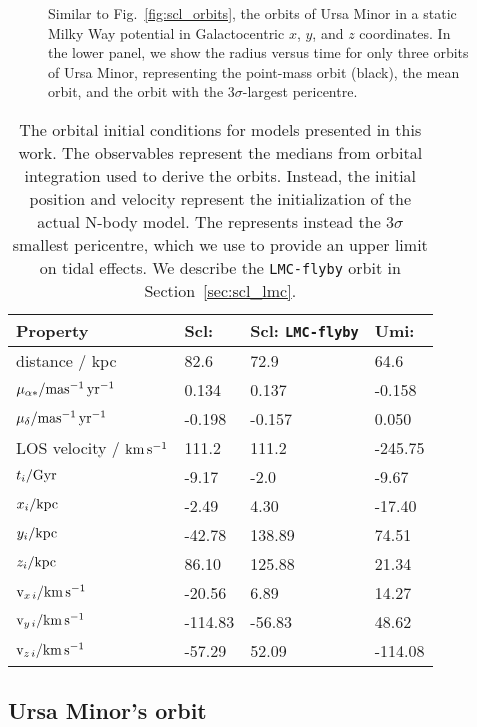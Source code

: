 \begin{figure}
\centering
{}
\caption[Ursa Minor's possible orbits]{Similar to
Fig.~\ref{fig:scl_orbits}, the orbits of Ursa Minor in a static Milky
Way potential in Galactocentric \(x\), \(y\), and \(z\) coordinates. In
the lower panel, we show the radius versus time for only three orbits of
Ursa Minor, representing the \smallperi{} point-mass orbit (black), the
mean orbit, and the orbit with the \(3\sigma\)-largest
pericentre.}\label{fig:umi_orbits}
\end{figure}

\begin{table*}[t]
\centering
\caption[Orbit initial conditions]{The orbital initial conditions for models presented in this work. The observables represent the medians from orbital integration used to derive the orbits. Instead, the initial position and velocity represent the initialization of the actual N-body model. The \smallperi{} represents instead the $3\sigma$ smallest pericentre, which we use to provide an upper limit on tidal effects. We describe the \texttt{LMC-flyby} orbit in Section \ref{sec:scl_lmc}. }
\label{tbl:orbit_ics}
\begin{tabular}{llll}
\toprule
Property & Scl: \smallperi{} & Scl: \verb|LMC-flyby| & Umi: \smallperi{}\\
\midrule
distance / kpc & 82.6 & 72.9 & 64.6\\
$\mu_{\alpha*} / {\rm mas^{-1}\,yr^{-1}}$ & 0.134 & 0.137 & -0.158\\
$\mu_{\delta} / {\rm mas^{-1}\,yr^{-1}}$ & -0.198 & -0.157 & 0.050\\
LOS velocity / ${\rm km\,s^{-1}}$ & 111.2 & 111.2 & -245.75\\
$t_i / {\rm Gyr}$ & -9.17 & -2.0 & -9.67\\
${x}_{i} / {\rm kpc}$ & -2.49 & 4.30 & -17.40\\
${y}_{i} / {\rm kpc}$ & -42.78 & 138.89 & 74.51\\
${z}_{i} / {\rm kpc}$ & 86.10 & 125.88 & 21.34\\
${\rm v}_{x\,i} / {\rm km\,s^{-1}}$ & -20.56 & 6.89 & 14.27\\
${\rm v}_{y\,i} / {\rm km\,s^{-1}}$ & -114.83 & -56.83 & 48.62\\
${\rm v}_{z\,i} / {\rm km\,s^{-1}}$ & -57.29 & 52.09 & -114.08\\
\bottomrule
\end{tabular}
\end{table*}

\subsection{Ursa Minor's orbit}\label{sec:orbit_corrections}

